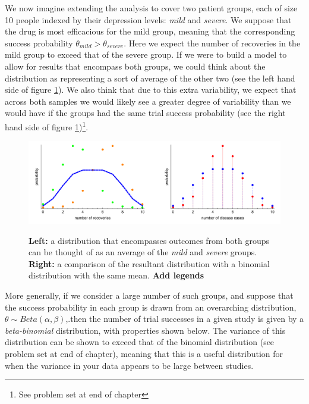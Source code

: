 \documentclass[11pt,fullpage]{book}
\begin{document}
We now imagine extending the analysis to cover two patient groups, each of size 10 people indexed by their depression levels: \textit{mild} and \textit{severe}. We suppose that the drug is most efficacious for the mild group, meaning that the corresponding success probability $\theta_{mild}> \theta_{severe}$. Here we expect the number of recoveries in the mild group to exceed that of the severe group. If we were to build a model to allow for results that encompass both groups, we could think about the distribution as representing a sort of average of the other two (see the left hand side of figure \ref{fig:Distributions_betaBinomialDispersion}). We also think that due to this extra variability, we expect that across both samples we would likely see a greater degree of variability than we would have if the groups had the same trial success probability (see the right hand side of figure \ref{fig:Distributions_betaBinomialDispersion})\footnote{See problem set at end of chapter}. 

\begin{figure}
\centering
\scalebox{0.5} 
{\includegraphics{Distributions_betaBinomialDispersion.pdf}}
\caption{\textbf{Left:} a distribution that encompasses outcomes from both groups can be thought of as an average of the \textit{mild} and \textit{severe} groups. \textbf{Right:} a comparison of the resultant distribution with a binomial distribution with the same mean. \textbf{Add legends}}\label{fig:Distributions_betaBinomialDispersion}
\end{figure} 

More generally, if we consider a large number of such groups, and suppose that the success probability in each group is drawn from an overarching distribution, $\theta\sim Beta(\alpha,\beta)$,.then the number of trial successes in a given study is given by a \textit{beta-binomial} distribution, with properties shown below. The variance of this distribution can be shown to exceed that of the binomial distribution (see problem set at end of chapter), meaning that this is a useful distribution for when the variance in your data appears to be large between studies.
\end{document}
